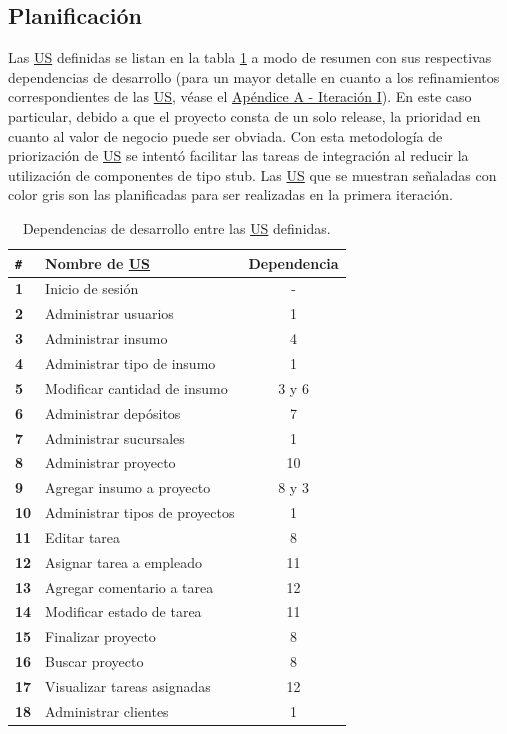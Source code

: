 \documentclass[a4paper, 12pt,twoside]{report}  %
\numberwithin{equation}{subsection} %
\begin{document}
\subsection{Planificación}
Las \hyperlink{US}{US} definidas se listan en la tabla \ref{tabla_dependencias_us} a modo de resumen con sus respectivas dependencias de desarrollo (para un mayor detalle en cuanto a los refinamientos correspondientes de las \hyperlink{US}{US}, véase el \hyperlink{apendice_a_I}{Apéndice A - Iteración I}). En este caso particular, debido a que el proyecto consta de un solo release, la prioridad en cuanto al valor de negocio puede ser obviada. Con esta metodología de priorización de \hyperlink{US}{US} se intentó facilitar las tareas de integración al reducir la utilización de componentes de tipo stub. Las \hyperlink{US}{US} que se muestran señaladas con color gris son las planificadas para ser realizadas en la primera iteración.

\begin{table}[h!]
	\centering
	\begin{tabular}{ |p{0.5cm}|p{9cm}|c|  }
		\hline
		\verb|#|& \textbf{Nombre de \hyperlink{US}{US}}& \textbf{Dependencia} \\
		\hline
		\textbf{1} & \cellcolor{marca_US_realizada}Inicio de sesión & - \\
		\hline
		\textbf{2} & \cellcolor{marca_US_realizada}Administrar usuarios & 1 \\
		\hline
		\textbf{3} & Administrar insumo & 4 \\
		\hline
		\textbf{4} & Administrar tipo de insumo & 1 \\
		\hline
		\textbf{5} & Modificar cantidad de insumo & 3 y 6 \\
		\hline
		\textbf{6} & \cellcolor{marca_US_realizada}Administrar depósitos & 7 \\
		\hline
		\textbf{7} & \cellcolor{marca_US_realizada}Administrar sucursales & 1 \\
		\hline
		\textbf{8} & Administrar proyecto & 10 \\
		\hline
		\textbf{9} & Agregar insumo a proyecto & 8 y 3 \\
		\hline
		\textbf{10} & Administrar tipos de proyectos & 1 \\
		\hline
		\textbf{11} & Editar tarea & 8 \\
		\hline
		\textbf{12} & Asignar tarea a empleado & 11\\
		\hline
		\textbf{13} & Agregar comentario a tarea & 12 \\
		\hline
		\textbf{14} & Modificar estado de tarea & 11 \\
		\hline
		\textbf{15} & Finalizar proyecto & 8 \\
		\hline
		\textbf{16} & Buscar proyecto & 8 \\
		\hline
		\textbf{17} & Visualizar tareas asignadas & 12 \\
		\hline
		\textbf{18} & \cellcolor{marca_US_realizada}Administrar clientes & 1 \\
		\hline
	\end{tabular}
	\caption{Dependencias de desarrollo entre las \protect\hyperlink{US}{US} definidas.}
	\label{tabla_dependencias_us}
\end{table}
\end{document}
